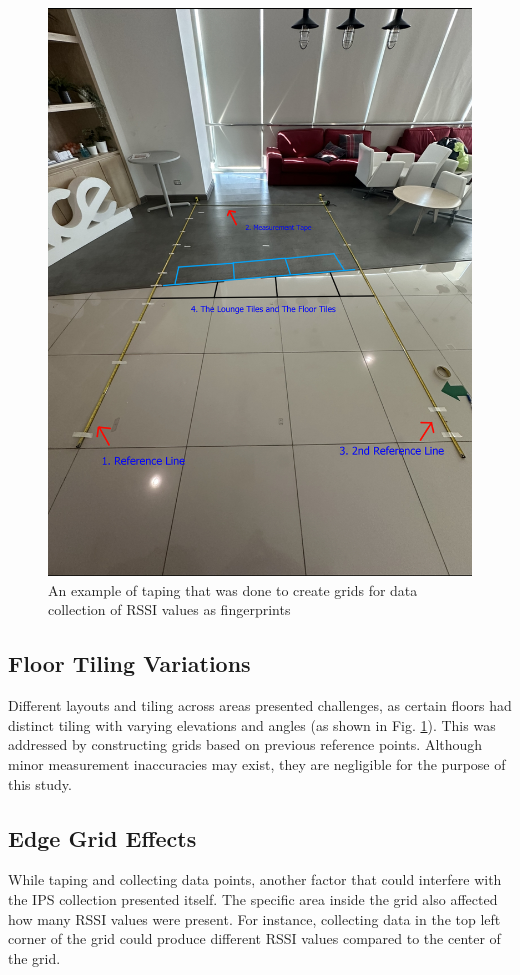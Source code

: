 \documentclass[runningheads]{llncs}
\begin{document}
\begin{figure}[!tbph]
	\centering
	\includegraphics[width=\textwidth]{figures/meth2.jpg}
	\caption{An example of taping that was done to create grids for data collection of RSSI values as fingerprints}
	\label{fig:taping}
\end{figure}

\subsection{Floor Tiling Variations}
Different layouts and tiling across areas presented challenges, as certain floors had distinct tiling with varying elevations and angles (as shown in Fig. \ref{fig:taping}). This was addressed by constructing grids based on previous reference points. Although minor measurement inaccuracies may exist, they are negligible for the purpose of this study.

\subsection{Edge Grid Effects}
While taping and collecting data points, another factor that could interfere with the IPS collection presented itself. The specific area inside the grid also affected how many RSSI values were present. For instance, collecting data in the top left corner of the grid could produce different RSSI values compared to the center of the grid. 
\end{document}
